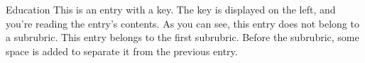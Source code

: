 \begin{rubric}{Education}
\entry*[2008--]
  This is an entry with a key. The key is displayed on the left, and you're
  reading the entry's contents. As you can see, this entry does not belong to
  a subrubric.
\entry*[2003--2008]
  This entry belongs to the first subrubric. Before the subrubric,
  some space is added to separate it from the previous entry.
\end{rubric}
